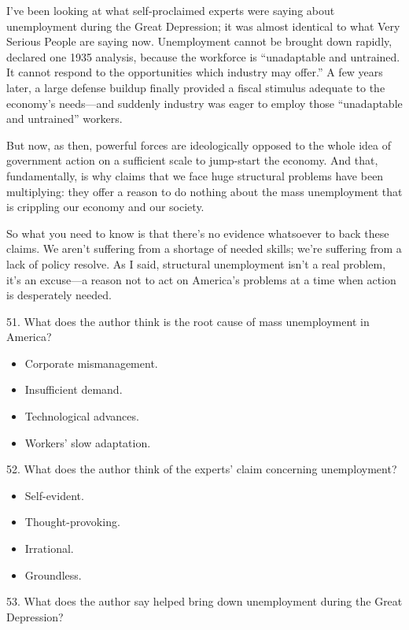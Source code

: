 \documentclass[UTF8,11pt]{ctexart}
\begin{document}
I’ve been looking at what self-proclaimed experts were saying about unemployment during the Great Depression; it was almost identical to what Very Serious People are saying now. Unemployment cannot be brought down rapidly, declared one 1935 analysis, because the workforce is “unadaptable and untrained. It cannot respond to the opportunities which industry may offer.” A few years later, a large defense buildup finally provided a fiscal stimulus adequate to the economy’s needs—and suddenly industry was eager to employ those “unadaptable and untrained” workers.


But now, as then, powerful forces are ideologically opposed to the whole idea of government action on a sufficient scale to jump-start the economy. And that, fundamentally, is why claims that we face huge structural problems have been multiplying: they offer a reason to do nothing about the mass unemployment that is crippling our economy and our society.


So what you need to know is that there’s no evidence whatsoever to back these claims. We aren’t suffering from a shortage of needed skills; we’re suffering from a lack of policy resolve. As I said, structural unemployment isn’t a real problem, it’s an excuse—a reason not to act on America’s problems at a time when action is desperately needed.


51. What does the author think is the root cause of mass unemployment in America?


\begin{itemize}[leftmargin=2em,itemsep=.2em,topsep=.4em]\item[A.] Corporate mismanagement.
\item[B.] Insufficient demand.
\item[C.] Technological advances.
\item[D.] Workers’ slow adaptation.
\end{itemize}

52. What does the author think of the experts’ claim concerning unemployment?


\begin{itemize}[leftmargin=2em,itemsep=.2em,topsep=.4em]\item[A.] Self-evident.
\item[B.] Thought-provoking.
\item[C.] Irrational.
\item[D.] Groundless.
\end{itemize}

53. What does the author say helped bring down unemployment during the Great Depression?
\end{document}
